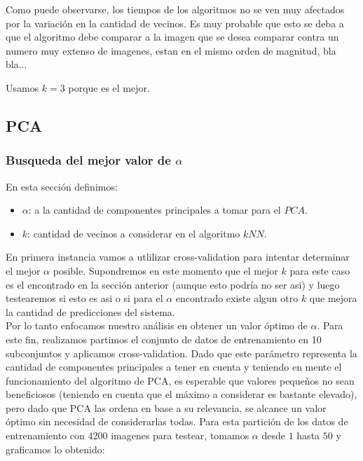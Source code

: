 Como puede observarse, los tiempos de los algoritmos no se ven muy afectados por la variación en la cantidad de vecinos. Es muy probable que esto se deba a que el algoritmo debe comparar a la imagen que se desea comparar contra un numero muy extenso de imagenes, estan en el mismo orden de magnitud, bla bla...
\completar

Usamos $k=3$ porque es el mejor.

\subsection{PCA}
\subsubsection{Busqueda del mejor valor de $\alpha$}
En esta sección definimos:
\begin{itemize}
	\item $\alpha$: a la cantidad de componentes principales a tomar para el $PCA$.
	\item $k$: cantidad de vecinos a considerar en el algoritmo $kNN$.
\end{itemize}
En primera instancia vamos a utlilizar cross-validation para intentar determinar el mejor $\alpha$ posible. Supondremos en este momento que el mejor $k$ para este caso es el encontrado en la sección anterior (aunque esto podría no ser asi) y luego testearemos si esto es asi o si para el $\alpha$ encontrado existe algun otro $k$ que mejora la cantidad de predicciones del sistema.
\\
Por lo tanto enfocamos nuestro análisis en obtener un valor óptimo de $\alpha$. Para este fin, realizamos partimos el conjunto de datos de entrenamiento en 10 subconjuntos y aplicamos cross-validation. Dado que este parámetro representa la cantidad de componentes principales a tener en cuenta y teniendo en mente el funcionamiento del algoritmo de PCA, es esperable que valores pequeños no sean beneficiosos (teniendo en cuenta que el máximo a considerar es bastante elevado), pero dado que PCA las ordena en base a su relevancia, se alcance un valor óptimo sin necesidad de considerarlas todas. Para esta partición de los datos de entrenamiento con 4200 imagenes para testear, tomamos $\alpha$ desde $1$ hasta $50$ y graficamos lo obtenido:

